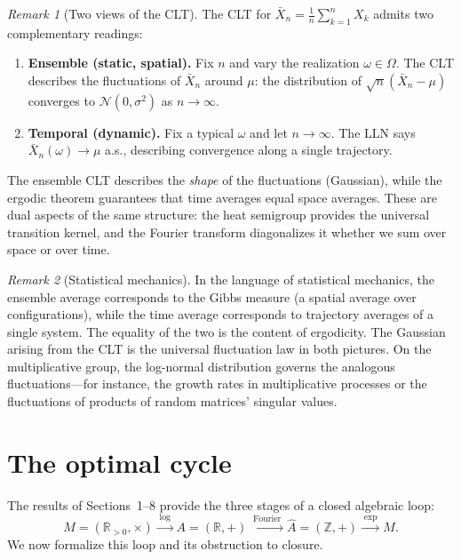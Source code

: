 \documentclass[12pt]{amsart}
\theoremstyle{definition}
\theoremstyle{remark}
\newtheorem*{remark}{Remark}
\newcommand{\R}{\mathbb{R}}
\newcommand{\Rpos}{\mathbb{R}_{>0}}
\newcommand{\Z}{\mathbb{Z}}
\newcommand{\cN}{\mathcal{N}}
\begin{document}
\begin{remark}[Two views of the CLT]\label{rmk:two-views}
The CLT for $\bar{X}_n = \frac{1}{n}\sum_{k=1}^n X_k$ admits two complementary readings:
\begin{enumerate}[label=(\alph*)]
\item \textbf{Ensemble (static, spatial).} Fix $n$ and vary the realization $\omega \in \Omega$. The CLT describes the fluctuations of $\bar{X}_n$ around $\mu$: the distribution of $\sqrt{n}(\bar{X}_n - \mu)$ converges to $\cN(0, \sigma^2)$ as $n \to \infty$.

\item \textbf{Temporal (dynamic).} Fix a typical $\omega$ and let $n \to \infty$. The LLN says $\bar{X}_n(\omega) \to \mu$ a.s., describing convergence along a single trajectory.
\end{enumerate}
The ensemble CLT describes the \emph{shape} of the fluctuations (Gaussian), while the ergodic theorem guarantees that time averages equal space averages. These are dual aspects of the same structure: the heat semigroup provides the universal transition kernel, and the Fourier transform diagonalizes it whether we sum over space or over time.
\end{remark}

\begin{remark}[Statistical mechanics]\label{rmk:statmech}
In the language of statistical mechanics, the ensemble average corresponds to the Gibbs measure (a spatial average over configurations), while the time average corresponds to trajectory averages of a single system. The equality of the two is the content of ergodicity. The Gaussian arising from the CLT is the universal fluctuation law in both pictures. On the multiplicative group, the log-normal distribution governs the analogous fluctuations---for instance, the growth rates in multiplicative processes or the fluctuations of products of random matrices' singular values.
\end{remark}

\section{The optimal cycle}\label{sec:cycle}

The results of Sections~1--8 provide the three stages of a closed algebraic loop:
\[
M = (\Rpos, \times)
\xrightarrow{\;\log\;}
A = (\R, +)
\xrightarrow{\;\text{Fourier}\;}
\widehat{A} = (\Z, +)
\xrightarrow{\;\exp\;}
M.
\]
We now formalize this loop and its obstruction to closure.
\end{document}
